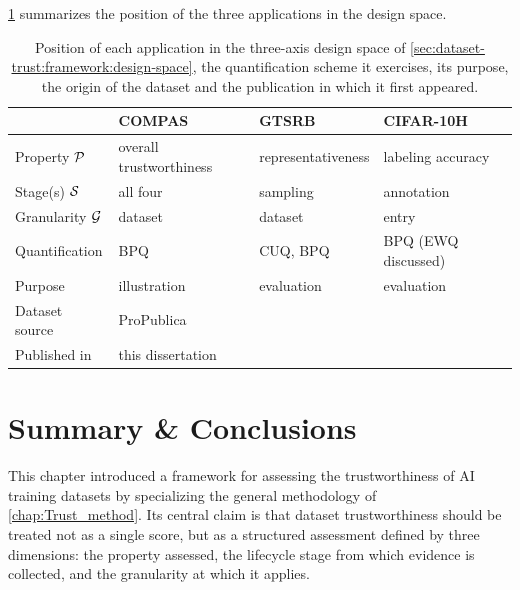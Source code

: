 \noindent \cref{tab:dataset-trust:applications-summary} summarizes the position of the three applications in the design space.

\begin{table}[!htbp]
  \centering
  \small
  \renewcommand{\arraystretch}{1.2}
  \begin{tabular}{@{}llll@{}}
    \toprule
     & \textbf{COMPAS} & \textbf{GTSRB} & \textbf{CIFAR-10H} \\
    \midrule
    Property $\mathcal{P}$        & overall trustworthiness & representativeness & labeling accuracy \\
    Stage(s) $\mathcal{S}$        & all four                & sampling           & annotation \\
    Granularity $\mathcal{G}$     & dataset                 & dataset            & entry \\
    Quantification           & \acs{BPQ}               & \acs{CUQ}, \acs{BPQ} & \acs{BPQ} (\acs{EWQ} discussed) \\
    Purpose                  & illustration            & evaluation         & evaluation \\
    \midrule
    Dataset source           & ProPublica~\cite{angwin2016machine} & \cite{stallkamp2012man} & \cite{peterson2019human} \\
    Published in             & this dissertation       & \cite{10.1007/978-3-032-19096-3_17} & \cite{trust-aidatatrust} \\
    \bottomrule
  \end{tabular}
  \caption{Position of each application in the three-axis design space of
    \cref{sec:dataset-trust:framework:design-space}, the quantification scheme it exercises, its purpose, the origin of the dataset and the publication in which it first appeared.}
  \label{tab:dataset-trust:applications-summary}
\end{table}

\FloatBarrier

\section{Summary \& Conclusions} \label{sec:dataset-trust:summary}

This chapter introduced a framework for assessing the trustworthiness of \ac{AI} training datasets by specializing the general methodology of \cref{chap:Trust_method}. Its central claim is that dataset trustworthiness should be treated not as a single score, but as a structured assessment defined by three dimensions: the property assessed, the lifecycle stage from which evidence is collected, and the granularity at which it applies.

